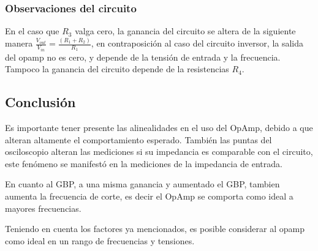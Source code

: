 \documentclass[../../main.tex]{subfiles}
\begin{document}
\subsubsection{Observaciones del circuito}
En el caso que $R_{3}$ valga cero, la ganancia del circuito se altera de la siguiente manera $ \frac{V_{out}}{V_{in}}=\frac {(R_{1}+R_{2})}{R_{1}}$, en contraposici\'on al caso del circuito inversor, la salida del opamp no es cero, y depende de la tensi\'on de entrada y la frecuencia. Tampoco la ganancia del circuito depende de la resistencias $R_{4}$.


\subsection{Conclusión}
Es importante tener presente las alinealidades en el uso del OpAmp, debido a que alteran altamente el comportamiento esperado. 
También las puntas del osciloscopio alteran las mediciones si su impedancia es comparable con el circuito, este fenómeno se manifestó en la mediciones de la impedancia de entrada.\par
En cuanto al GBP, a una misma ganancia y aumentado el GBP, tambien aumenta la frecuencia de corte, es decir el OpAmp se comporta como ideal a mayores frecuencias. \par
Teniendo en cuenta los factores ya mencionados, es posible considerar al opamp como ideal en un rango de frecuencias y tensiones.
\end{document}
